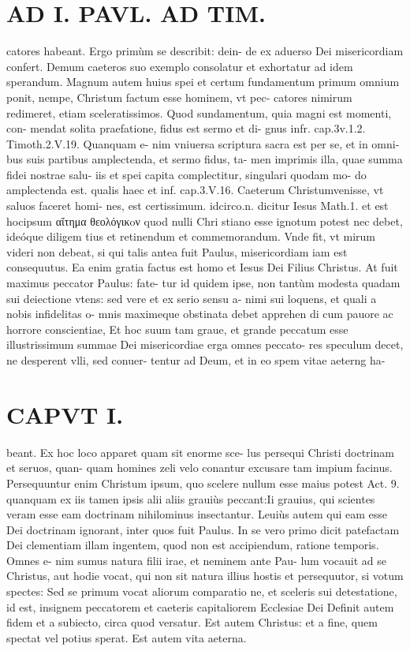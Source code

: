 \documentclass{article}
\begin{document}
\begin{pages}
\section*{AD I. PAVL. AD TIM. }
\marginpar{[ p.28. ]}\pstart catores habeant. Ergo primùm se describit: dein- de ex aduerso Dei misericordiam confert. Demum caeteros suo exemplo consolatur et exhortatur ad idem sperandum. Magnum autem huius spei et certum fundamentum primum omnium ponit, nempe, Christum factum esse hominem, vt pec- catores nimirum redimeret, etiam sceleratissimos. Quod sundamentum, quia magni est momenti, con- mendat solita praefatione, fidus est sermo et di- gnus infr. cap.3v.1.2. Timoth.2.V.19. Quanquam e- nim vniuersa scriptura sacra est per se, et in omni- bus suis partibus amplectenda, et sermo fidus, ta- men imprimis illa, quae summa fidei nostrae salu- iis et spei capita complectitur, singulari quodam mo- do amplectenda est. qualis haec et inf. cap.3.V.16. Caeterum Christumvenisse, vt saluos faceret homi- nes, est certissimum. idcirco.n. dicitur Iesus Math.1. et est hocipsum αἴτημα θεολόγικoν quod nulli Chri stiano esse ignotum potest nec debet, ideóque  diligem tius et retinendum et commemorandum. Vnde fit, vt mirum videri non debeat, si qui talis antea fuit Paulus, misericordiam iam est consequutus. Ea enim gratia factus est homo et Iesus Dei Filius Christus. At fuit maximus peccator Paulus: fate- tur id quidem ipse, non tantùm modesta quadam sui deiectione vtens: sed vere et ex serio sensu a- nimi sui loquens, et quali a nobis infidelitas o- mnis maximeque obstinata debet apprehen di cum pauore ac horrore conscientiae, Et hoc suum tam graue, et grande peccatum esse illustrissimum summae Dei misericordiae erga omnes peccato- res speculum decet, ne desperent vlli, sed conuer- tentur ad Deum, et in eo spem vitae aeterng ha-  \pend
\section*{CAPVT I. }
\marginpar{[ p.29 ]}\pstart beant. Ex hoc loco apparet quam sit enorme sce- lus persequi Christi doctrinam et seruos, quan- quam homines zeli velo conantur excusare tam impium facinus. Persequuntur enim Christum ipsum, quo scelere nullum esse maius potest Act. 9. quanquam ex iis tamen ipsis alii aliis grauiùs peccant:Ii grauius, qui scientes veram esse eam doctrinam nihilominus insectantur. Leuiùs autem qui eam esse Dei doctrinam ignorant, inter quos fuit Paulus. In se vero primo dicit patefactam Dei clementiam illam ingentem, quod non est accipiendum, ratione temporis. Omnes e- nim sumus natura filii irae, et neminem ante Pau- lum vocauit ad se Christus, aut hodie vocat, qui non sit natura illius hostis et persequutor, si votum spectes: Sed se primum vocat aliorum comparatio ne, et sceleris sui detestatione, id est, insignem peccatorem et caeteris capitaliorem Ecclesiae Dei Definit autem fidem et a subiecto, circa quod versatur. Est autem Christus: et a fine, quem spectat vel potius sperat. Est autem vita aeterna.  \pend
{}
{}

\end{pages}
\end{document}
